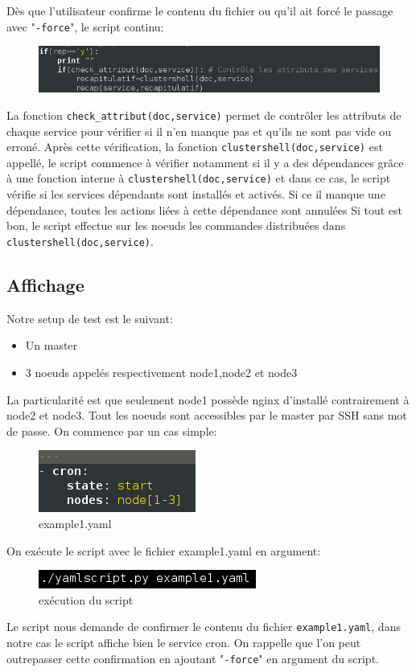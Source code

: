\documentclass[a4paper,11pt]{article}
\begin{document}
\pagebreak
\noindent
Dès que l'utilisateur confirme le contenu du fichier ou qu'il ait forcé le passage avec "\verb?-force?", le script continu: 
\smallbreak
\begin{figure}[hbtp]
\centering
\includegraphics[scale=0.7]{clustershell_yaml.png}
\end{figure}
\smallbreak

\noindent
La fonction \verb?check_attribut(doc,service)? permet de contrôler les attributs de chaque service pour vérifier si il n'en manque pas et qu'ils ne sont pas vide ou erroné.
\smallbreak
\noindent
Après cette vérification, la fonction \verb?clustershell(doc,service)? est appellé, le script commence à vérifier notamment si il y a des dépendances grâce à une fonction interne à \verb?clustershell(doc,service)?  et dans ce cas, le script vérifie si les services dépendants sont installés et activés. Si ce il manque une dépendance, toutes les actions liées à cette dépendance sont annulées Si tout est bon, le script effectue sur les noeuds les commandes distribuées dans \verb?clustershell(doc,service)?.


\subsection{Affichage}
\label{sub:4.5}

Notre setup de test est le suivant: 
\begin{itemize}
\item Un master
\item 3 noeuds appelés respectivement node1,node2 et node3
\end{itemize}
La particularité est que seulement node1 possède nginx d'installé contrairement à node2 et node3.
\smallbreak
\noindent
Tout les noeuds sont accessibles par le master par SSH sans mot de passe.
On commence par un cas simple:
\smallbreak
\begin{figure}[hbtp]
\centering
\includegraphics[scale=0.7]{example1_yaml.png}
\caption{example1.yaml}
\end{figure}
\noindent
On exécute le script avec le fichier example1.yaml en argument:
\smallbreak
\begin{figure}[hbtp]
\centering
\includegraphics[scale=0.7]{execution_yaml.png}
\caption{exécution du script}
\end{figure}
\noindent
Le script nous demande de confirmer le contenu du fichier \verb?example1.yaml?, dans notre cas le script affiche bien le service cron. On rappelle que l'on peut outrepasser cette confirmation en ajoutant "\verb?-force?" en argument du script.
\smallbreak
\end{document}
